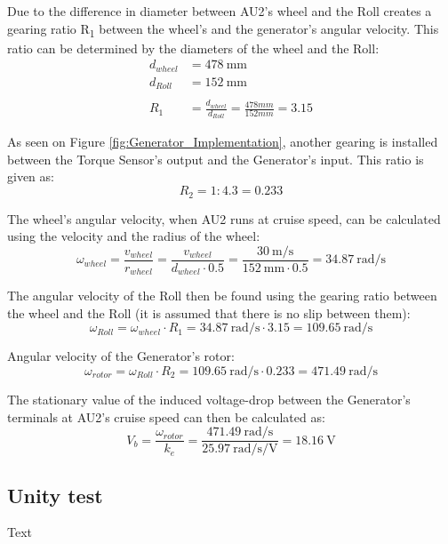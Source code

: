 Due to the difference in diameter between AU2's wheel and the Roll creates a gearing ratio R\textsubscript{1} between the wheel's and the generator's angular velocity. This ratio can be determined by the diameters of the wheel and the Roll:
\begin{equation}
	\begin{split}
		d_{wheel} &= \SI{478}{\milli \meter}\\
		d_{Roll} &= \SI{152}{\milli \meter}\\
		\\
		R_1 &= \frac{d_{wheel}}{d_{Roll}} = \frac{478 mm}{152 mm} = 3.15
	\end{split}
\end{equation}

As seen on Figure \vref{fig:Generator_Implementation}, another gearing is installed between the Torque Sensor's output and the Generator's input. This ratio is given as:
\begin{equation}
	R_2 = 1:4.3 = 0.233
\end{equation}

The wheel's angular velocity, when AU2 runs at cruise speed, can be calculated using the velocity and the radius of the wheel:
\begin{equation}
	\omega_{wheel} = \frac{v_{wheel}}{r_{wheel}} = \frac{v_{wheel}}{d_{wheel} \cdot 0.5} = \frac{\SI[per-mode=fraction]{30}{\meter \per \second}}{\SI{152}{\milli \meter} \cdot 0.5} = \SI[per-mode=fraction]{34.87}{\radian \per \second}
\end{equation}

The angular velocity of the Roll then be found using the gearing ratio between the wheel and the Roll (it is assumed that there is no slip between them):
\begin{equation}
		\omega_{Roll} = \omega_{wheel} \cdot R_1 = \SI[per-mode=fraction]{34.87}{\radian \per \second} \cdot 3.15 = \SI[per-mode=fraction]{109.65}{\radian \per \second}
\end{equation}

Angular velocity of the Generator's rotor:
\begin{equation}
		\omega_{rotor} = \omega_{Roll} \cdot R_2 = \SI[per-mode=fraction]{109.65}{\radian \per \second} \cdot 0.233 = \SI[per-mode=fraction]{471.49}{\radian \per \second}
\end{equation}

The stationary value of the induced voltage-drop between the Generator's terminals at AU2's cruise speed can then be calculated as:
\begin{equation}
		V_b = \frac{\omega_{rotor}}{k_e} = \frac{\SI[per-mode=fraction]{471.49}{\radian \per \second}}{\SI[per-mode=fraction]{25.97}{\radian \per \second \per \volt}} = \SI{18.16}{\volt}
\end{equation}

\subsection{Unity test}
Text